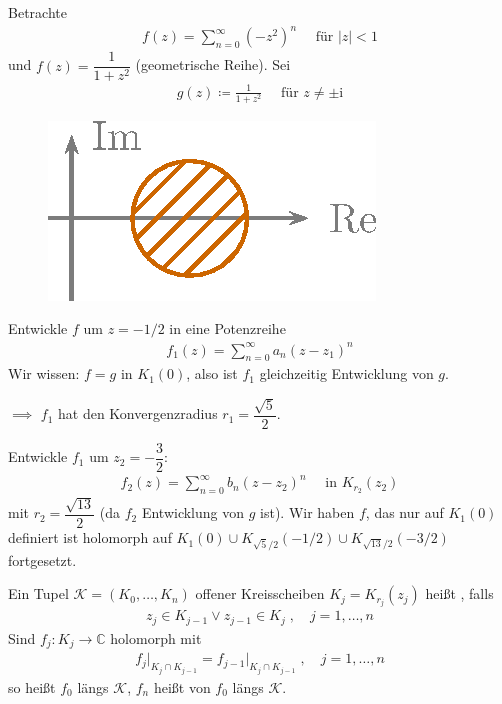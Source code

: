 \documentclass[a4paper,10pt]{scrbook}
\begin{document}

\begin{example}
  Betrachte
  \begin{align*}
    f(z) = \sum\limits_{n=0}^{\infty} (-z^2)^n \quad \text{ für } |z| < 1
  \end{align*}
  und $f(z) = \dfrac{1}{1 + z^2}$ (geometrische Reihe). Sei
  \begin{align*}
    g(z) \coloneq \frac{1}{1 + z^2} \quad \text{ für } z \neq \pm \mathrm{i}
  \end{align*}
  \begin{figure}[H]
    \centering
    \includegraphics[scale=0.2]{images/ana3-tmp-42}
  \end{figure}
  Entwickle $f$ um $z = -1/2$ in eine Potenzreihe
  \begin{align*}
    f_1(z) = \sum\limits_{n=0}^{\infty} a_n (z-z_1)^n
  \end{align*}
  Wir wissen: $f = g$ in $K_1(0)$, also ist $f_1$ gleichzeitig Entwicklung von $g$.

  $\implies$ $f_1$ hat den Konvergenzradius $r_1 = \dfrac{\sqrt{5}}{2}$.

  Entwickle $f_1$ um $z_2 = -\dfrac{3}{2}$:
  \begin{align*}
    f_2(z) = \sum\limits_{n=0}^{\infty} b_n (z-z_2)^n \quad \text{ in } K_{r_2}(z_2)
  \end{align*}
  mit $r_2 = \dfrac{\sqrt{13}}{2}$ (da $f_2$ Entwicklung von $g$ ist). Wir haben $f$, das nur auf $K_1(0)$ definiert ist holomorph auf $K_1(0) \cup K_{\sqrt{5}/{2}}(-1/2) \cup K_{\sqrt{13}/2}(-3/2)$ fortgesetzt.
\end{example}

\begin{theorem}[Definition]
  Ein Tupel $\mathcal{K} = (K_0,\ldots,K_n)$ offener Kreisscheiben $K_j = K_{r_j}(z_j)$ heißt , falls
  \begin{align*}
    z_j \in K_{j-1} \lor z_{j-1} \in K_{j} \; , \quad j = 1,\ldots,n
  \end{align*}
  Sind $f_j : K_j \to \mathbb{C}$ holomorph mit
  \begin{align*}
    f_j \Big|_{K_j \cap K_{j-1}} = f_{j-1} \Big|_{K_j \cap K_{j-1}} \; , \quad j = 1,\ldots,n
  \end{align*}
  so heißt $f_0$  längs $\mathcal{K}$, $f_n$ heißt  von $f_0$ längs $\mathcal{K}$.
\end{theorem}
\end{document}
